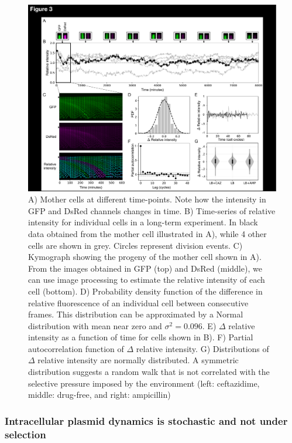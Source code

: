 \documentclass[fleqn,12pt]{wlscirep}
\begin{document}
\begin{figure}[h!]
\centering
\includegraphics[width=.9\linewidth]{figures/Figure3.pdf}
\caption{ \small{ A) Mother cells at different time-points.  Note how the intensity in GFP and DsRed channels changes in time.  B) Time-series of relative intensity for individual cells in a long-term experiment. In black data obtained from the mother cell illustrated in A), while 4 other cells are shown in grey. Circles represent division events. C) Kymograph showing the progeny of the mother cell shown in A). From the images obtained in GFP (top) and DsRed (middle), we can use image processing to estimate the relative intensity of each cell (bottom).  D) Probability density function of the difference in relative fluorescence of an individual cell between consecutive frames.  This distribution can be approximated by a Normal distribution with mean near zero and $\sigma^2=0.096$.  E) $\Delta$ relative intensity as a function of time for cells shown in B).  F) Partial autocorrelation function of $\Delta$ relative intensity.  G) Distributions of $\Delta$ relative intensity are normally distributed.  A symmetric distribution suggests a random walk that is not correlated with the selective pressure imposed by the environment (left: ceftazidime, middle: drug-free, and right: ampicillin) }}
\label{fig:mother-machine}
\end{figure}

\subsubsection{Intracellular plasmid dynamics is stochastic and not under selection}
\end{document}
